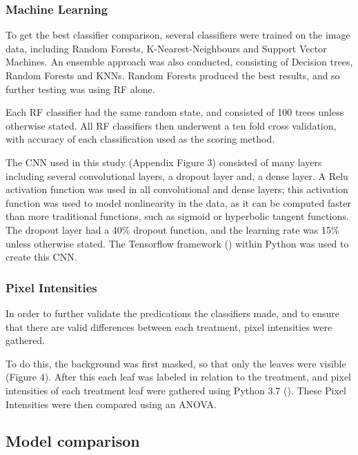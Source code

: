 \documentclass[../../Paper.tex]{subfiles}
\begin{document}
\subsubsection*{Machine Learning}

To get the best classifier comparison, several classifiers were trained on the image data, including Random Forests, K-Nearest-Neighbours and Support Vector Machines.  An ensemble approach was also conducted, consisting of Decision trees, Random Forests and KNNs. Random Forests produced the best results, and so further testing was using RF alone.

Each RF classifier had the same random state, and consisted of 100 trees unless otherwise stated. All RF classifiers then underwent a ten fold cross validation, with accuracy of each classification used as the scoring method. 

The CNN used in this study (Appendix Figure 3) consisted of many layers including several convolutional layers, a dropout layer and, a dense layer. A Relu activation function was used in all convolutional and dense layers; this activation function was used to model nonlinearity in the data, as it
can be computed faster than more traditional functions, such as sigmoid or hyperbolic tangent functions. The dropout layer had a 40\% dropout function, and the learning rate was 15\% unless otherwise stated. The Tensorflow framework (\cite{abadi_tensorflow_2016}) within Python was used to create this CNN.



\subsubsection*{Pixel Intensities}

In order to further validate the predications the classifiers made, and to ensure that there are valid differences between each treatment, pixel intensities were gathered. 

To do this, the background was first masked, so that only the leaves were visible (Figure 4). After this each leaf was labeled in relation to the treatment, and pixel intensities of each treatment leaf were gathered using Python 3.7  (\cite{van_rossum_python_2001}). These Pixel Intensities were then compared using an ANOVA. 


\subsection*{Model comparison}
\end{document}
